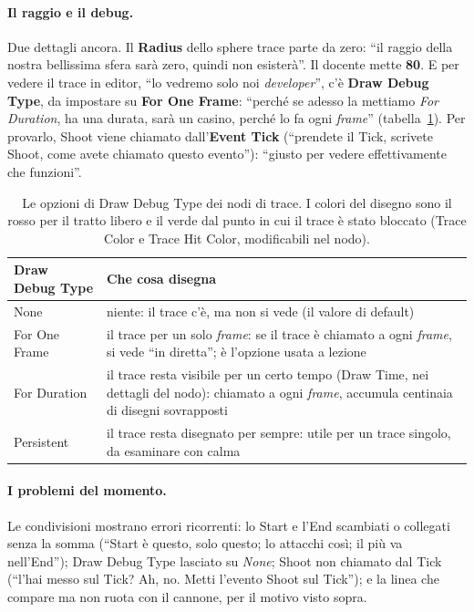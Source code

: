 \paragraph{Il raggio e il debug.} Due dettagli ancora. Il \textbf{Radius} dello sphere
trace parte da zero: ``il raggio della nostra bellissima sfera sarà zero, quindi non
esisterà''. Il docente mette \textbf{80}. E per vedere il trace in editor, ``lo vedremo
solo noi \emph{developer}'', c'è \textbf{Draw Debug Type}, da impostare su \textbf{For
One Frame}: ``perché se adesso la mettiamo \emph{For Duration}, ha una durata, sarà un
casino, perché lo fa ogni \emph{frame}'' (tabella~\ref{ue5:tab:debug}). Per provarlo,
Shoot viene chiamato dall'\textbf{Event Tick} (``prendete il Tick, scrivete Shoot,
come avete chiamato questo evento''): ``giusto per vedere effettivamente che
funzioni''.

\begin{table}[htbp]
\centering
\small
\begin{tabular}{@{}p{3.0cm}p{11.0cm}@{}}
\toprule
\textbf{Draw Debug Type} & \textbf{Che cosa disegna} \\
\midrule
None & niente: il trace c'è, ma non si vede (il valore di default) \\
For One Frame & il trace per un solo \emph{frame}: se il trace è chiamato a ogni
\emph{frame}, si vede ``in diretta''; è l'opzione usata a lezione \\
For Duration & il trace resta visibile per un certo tempo (Draw Time, nei dettagli del
nodo): chiamato a ogni \emph{frame}, accumula centinaia di disegni sovrapposti \\
Persistent & il trace resta disegnato per sempre: utile per un trace singolo, da
esaminare con calma \\
\bottomrule
\end{tabular}
\caption{Le opzioni di Draw Debug Type dei nodi di trace. I colori del disegno sono il
rosso per il tratto libero e il verde dal punto in cui il trace è stato bloccato (Trace
Color e Trace Hit Color, modificabili nel nodo).}
\label{ue5:tab:debug}
\end{table}

\paragraph{I problemi del momento.} Le condivisioni mostrano errori ricorrenti: lo
Start e l'End scambiati o collegati senza la somma (``Start è questo, solo questo; lo
attacchi così; il più va nell'End''); Draw Debug Type lasciato su \emph{None}; Shoot non
chiamato dal Tick (``l'hai messo sul Tick? Ah, no. Metti l'evento Shoot sul Tick''); e
la linea che compare ma non ruota con il cannone, per il motivo visto sopra.

